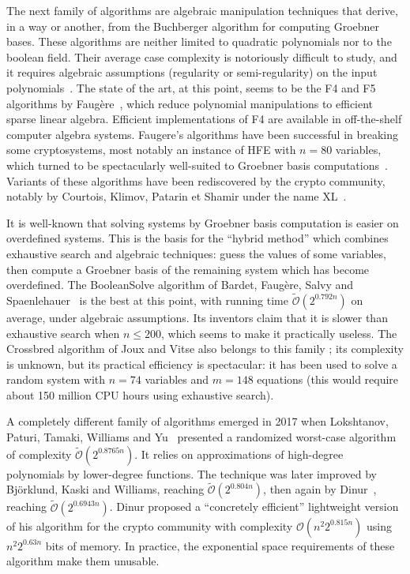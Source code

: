 \documentclass[a4paper]{article}
\newcommand{\bigO}[1]{\ensuremath{\mathcal{O}\left( #1 \right)} }
\newcommand{\bigOsoft}[1]{\ensuremath{\mathcal{\tilde O}\left( #1 \right)} }
\begin{document}
The next family of algorithms are algebraic manipulation techniques that derive,
in a way or another, from the Buchberger algorithm for computing Groebner
bases. These algorithms are neither limited to quadratic polynomials nor to the
boolean field. Their average case complexity is notoriously difficult to study,
and it requires algebraic assumptions (regularity or semi-regularity) on the
input polynomials~\cite{BardetFS15}.  The state of the art, at this point, seems
to be the F4 and F5 algorithms by Faugère~\cite{F4,F5}, which reduce polynomial
manipulations to efficient sparse linear algebra. Efficient implementations of
F4 are available in off-the-shelf computer algebra systems. Faugere's algorithms
have been successful in breaking some cryptosystems, most notably an instance of
HFE with $n=80$ variables, which turned to be spectacularly well-suited to
Groebner basis computations~\cite{FaugereJ03}. Variants of these algorithms have
been rediscovered by the crypto community, notably by Courtois, Klimov, Patarin
et Shamir under the name XL~\cite{CourtoisKPS00}.

It is well-known that solving systems by Groebner basis computation is easier on
overdefined systems. This is the basis for the ``hybrid method'' which combines
exhaustive search and algebraic techniques: guess the values of some variables,
then compute a Groebner basis of the remaining system which has become
overdefined. The \textsf{BooleanSolve} algorithm of Bardet, Faugère, Salvy and
Spaenlehauer~\cite{BardetFSS13} is the best at this point, with running time
$\bigOsoft{2^{0.792n}}$ on average, under algebraic assumptions. Its inventors
claim that it is slower than exhaustive search when $n \leq 200$, which seems to
make it practically useless. The \textsf{Crossbred} algorithm of Joux and Vitse
also belongs to this family ; its complexity is unknown, but its practical
efficiency is spectacular: it has been used to solve a random system with
$n = 74$ variables and $m=148$ equations (this would require about 150 million
CPU hours using exhaustive search).

A completely different family of algorithms emerged in 2017 when Lokshtanov,
Paturi, Tamaki, Williams and Yu~\cite{LokshtanovPTWY17} presented a randomized
worst-case algorithm of complexity $\bigOsoft{2^{0.8765n}}$. It relies on
approximations of high-degree polynomials by lower-degree functions. The
technique was later improved by Björklund, Kaski and Williams, reaching
$\bigOsoft{2^{0.804n}}$, then again by Dinur~\cite{Dinur21}, reaching
$\bigOsoft{2^{0.6943n}}$. Dinur proposed a ``concretely efficient'' lightweight
version of his algorithm for the crypto community with complexity
$\bigO{n^2 2^{0.815n}}$ using $n^2 2^{0.63n}$ bits of memory. In practice, the
exponential space requirements of these algorithm make them unusable.
\end{document}
